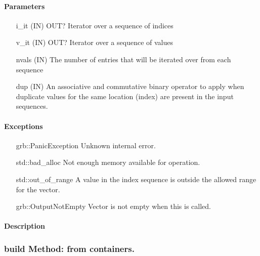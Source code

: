 {\paragraph{Parameters}

\begin{itemize}[leftmargin=1.1in]
    \item[{\sf i\_it}]   ({\sf IN}) OUT? Iterator over a sequence of indices
    \item[{\sf v\_it}]   ({\sf IN}) OUT? Iterator over a sequence of values
    \item[{\sf nvals}]   ({\sf IN}) The number of entries that will be iterated over from each sequence
    \item[{\sf dup}]     ({\sf IN}) An associative and commutative binary operator
                                    to apply when duplicate values for the same
                                    location (index) are present in the input sequences.
\end{itemize}

\paragraph{Exceptions}

\begin{itemize}[leftmargin=2.1in]
    \item[{\sf grb::PanicException}]   Unknown internal error.
    \item[{\sf std::bad\_alloc}]       Not enough memory available for operation.
    \item[{\sf std::out\_of\_range}]   A value in the index sequence is outside the
                                       allowed range for the vector.
    \item[{\sf grb::OutputNotEmpty}]   Vector is not empty when this is called.                                  
\end{itemize}

\paragraph{Description}

\subsubsection{{\sf build} Method: from containers.}


}

